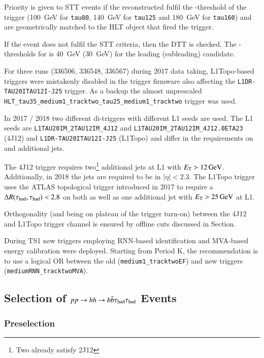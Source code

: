 Priority is given to STT events if the reconstructed \tauhad fulfil the
\pT-threshold of the trigger (\SI{100}{\GeV} for \verb|tau80|, \SI{140}{\GeV}
for \verb|tau125| and \SI{180}{\GeV} for \verb|tau160|) and are geometrically
matched to the HLT object that fired the trigger.

If the event does not fulfil the STT criteria, then the DTT is checked. The
\pT-thresholds for \tauhadvis is \SI{40}{\GeV} (\SI{30}{\GeV}) for the leading
(subleading) \tauhadvis candidate.

For three runs (336506, 336548, 336567) during 2017 data taking, L1Topo-based
triggers were mistakenly disabled in the trigger firmware also affecting the
\verb|L1DR-TAU20ITAU12I-J25| trigger. As a backup the almost unprescaled
\verb|HLT_tau35_medium1_tracktwo_tau25_medium1_tracktwo| trigger was used.

In 2017 / 2018 two different di-\tauhad triggers with different L1 seeds are
used. The L1 seeds are \verb|L1TAU20IM_2TAU12IM_4J12| and
\verb|L1TAU20IM_2TAU12IM_4J12.0ETA23| (4J12) and \verb|L1DR-TAU20ITAU12I-J25|
(L1Topo) and differ in the requirements on \tauhadvis and additional jets.

The 4J12 trigger requires two\footnote{Two \tauhadvis already satisfy 2J12}
additional jets at L1 with $\ET > \SI{12}{\GeV}$. Additionally, in 2018 the jets
are required to be in $|\eta| < 2.3$. The L1Topo trigger uses the ATLAS
topological trigger introduced in 2017 to require a $\Delta R(\tau_{\text{had}}, \tau_{\text{had}})
< 2.8$ on both \tauhad as well as one additional jet with $E_{\text{T}} > \SI{25}{\ensuremath{\text{GeV}}}$
at L1.

Orthogonality (and being on plateau of the trigger turn-on) between the 4J12 and
L1Topo trigger channel is ensured by offline cuts discussed in
Section.%

During TS1 new \tauhadvis triggers employing RNN-based \tauhad identification
and MVA-based energy calibration were deployed. Starting from Period K, the
recommendation is to use a logical OR between the old
(\verb|medium1_tracktwoEF|) and new triggers (\verb|mediumRNN_tracktwoMVA|).


\subsection{Selection of $pp \rightarrow hh \rightarrow b\bar{b}\tau_{\text{had}}\tau_{\text{had}}$ Events}


\subsubsection{Preselection}


